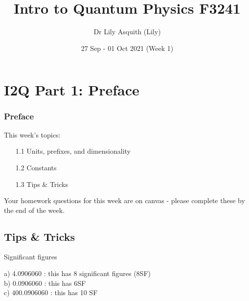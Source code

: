 


% 
\title[ Intro to Quantum Physics]{Intro to Quantum Physics F3241}
\author[Dr Lily Asquith (Lily)]{ Dr Lily Asquith (Lily)}
\date[27 Sep - 01 Oct 2021]{ 27 Sep - 01 Oct 2021 (Week 1)}





\begin{frame}
\titlepage
\end{frame} 

\section{I2Q Part 1: Preface}
\begin{frame}
\frametitle{Preface} 
\normalsize

This week's topics:\\[3ex]

\begin{itemize}
\item[1.1] Units, prefixes, and dimensionality\\[3ex]
\item[1.2] Constants\\[3ex]
\item[1.3] Tips \& Tricks\\[3ex]
\end{itemize}

Your homework questions for this week are on canvas - please complete these by the end of the week.
\end{frame} 
 


\subsection{Tips \& Tricks}

 \begin{frame}{Significant figures}

a) 4.0906060 : this has 8 significant figures (8SF)\\[1ex]
b) 0.0906060 : this has 6SF\\[1ex]
c) 400.0906060 : this has 10 SF\\[1ex]


\end{frame}


